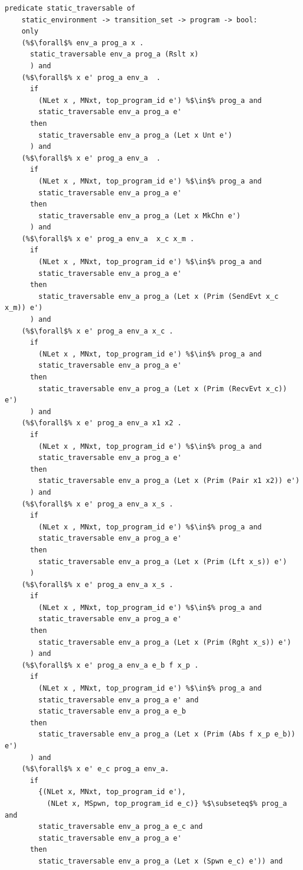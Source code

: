 \documentclass{article}
\begin{document}
\begin{lstlisting}[language=logic, escapechar=\%]
  predicate static_traversable of
    static_environment -> transition_set -> program -> bool:
    only
    (%$\forall$% env_a prog_a x .
      static_traversable env_a prog_a (Rslt x)
      ) and
    (%$\forall$% x e' prog_a env_a  .
      if
        (NLet x , MNxt, top_program_id e') %$\in$% prog_a and
        static_traversable env_a prog_a e'
      then
        static_traversable env_a prog_a (Let x Unt e')
      ) and
    (%$\forall$% x e' prog_a env_a  .
      if
        (NLet x , MNxt, top_program_id e') %$\in$% prog_a and
        static_traversable env_a prog_a e'
      then
        static_traversable env_a prog_a (Let x MkChn e')
      ) and
    (%$\forall$% x e' prog_a env_a  x_c x_m .
      if
        (NLet x , MNxt, top_program_id e') %$\in$% prog_a and
        static_traversable env_a prog_a e'
      then
        static_traversable env_a prog_a (Let x (Prim (SendEvt x_c x_m)) e')
      ) and
    (%$\forall$% x e' prog_a env_a x_c .
      if
        (NLet x , MNxt, top_program_id e') %$\in$% prog_a and
        static_traversable env_a prog_a e'
      then
        static_traversable env_a prog_a (Let x (Prim (RecvEvt x_c)) e')
      ) and
    (%$\forall$% x e' prog_a env_a x1 x2 .
      if
        (NLet x , MNxt, top_program_id e') %$\in$% prog_a and
        static_traversable env_a prog_a e'
      then
        static_traversable env_a prog_a (Let x (Prim (Pair x1 x2)) e')
      ) and
    (%$\forall$% x e' prog_a env_a x_s .
      if
        (NLet x , MNxt, top_program_id e') %$\in$% prog_a and
        static_traversable env_a prog_a e'
      then
        static_traversable env_a prog_a (Let x (Prim (Lft x_s)) e')
      )
    (%$\forall$% x e' prog_a env_a x_s .
      if
        (NLet x , MNxt, top_program_id e') %$\in$% prog_a and
        static_traversable env_a prog_a e'
      then
        static_traversable env_a prog_a (Let x (Prim (Rght x_s)) e')
      ) and
    (%$\forall$% x e' prog_a env_a e_b f x_p .
      if
        (NLet x , MNxt, top_program_id e') %$\in$% prog_a and
        static_traversable env_a prog_a e' and
        static_traversable env_a prog_a e_b
      then
        static_traversable env_a prog_a (Let x (Prim (Abs f x_p e_b)) e')
      ) and
    (%$\forall$% x e' e_c prog_a env_a.
      if
        {(NLet x, MNxt, top_program_id e'),
          (NLet x, MSpwn, top_program_id e_c)} %$\subseteq$% prog_a and
        static_traversable env_a prog_a e_c and
        static_traversable env_a prog_a e'
      then
        static_traversable env_a prog_a (Let x (Spwn e_c) e')) and


\end{lstlisting}
\end{document}

